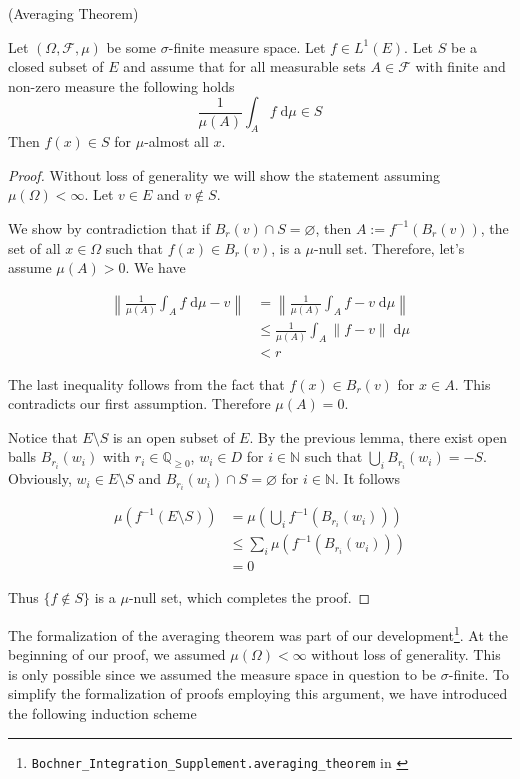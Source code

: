 \begin{theorem}\label{thm:averaging_theorem} (Averaging Theorem) \par
Let $(\Omega, \mathcal{F}, \mu)$ be some $\sigma$-finite measure space. Let $f \in L^1(E)$. Let $S$ be a closed subset of $E$ and assume that for all measurable sets $A \in \mathcal{F}$ with finite and non-zero measure the following holds
\[
	\frac{1}{\mu(A)}\int_A f \;\textrm{d}\mu \in S
\]
Then $f(x) \in S$ for $\mu$-almost all $x$.
\end{theorem}
\begin{proof}
Without loss of generality we will show the statement assuming $\mu(\Omega) < \infty$. Let $v \in E$ and $v \notin S$. 

We show by contradiction that if $B_r(v) \cap S = \varnothing$,  then $A := f^{-1}(B_r(v))$, the set of all $x \in \Omega$ such that $f(x) \in B_r(v)$, is a $\mu$-null set. Therefore, let's assume $\mu(A) > 0$. We have

\begin{align*}
	\left\lVert \frac{1}{\mu(A)}\int_A f \;\textrm{d}\mu  - v \right\rVert &= \left\lVert \frac{1}{\mu(A)}\int_A f - v \;\textrm{d}\mu \right\rVert \\
	&\le \frac{1}{\mu(A)}\int_A \lVert f - v \rVert \;\textrm{d}\mu \\
	&< r
\end{align*}

The last inequality follows from the fact that $f(x) \in B_r(v)$ for $x \in A$. This contradicts our first assumption. Therefore $\mu(A) = 0$.

Notice that $E \setminus S$ is an open subset of $E$. By the previous lemma, there exist open balls $B_{r_i}(w_i)$ with $r_i \in \mathbb{Q}_{\ge 0}$, $w_i \in D$ for $i \in \mathbb{N}$ such that $\bigcup_i B_{r_i}(w_i) = - S$. Obviously, $w_i \in E \setminus S$ and $B_{r_i}(w_i) \cap S = \varnothing$ for $i \in \mathbb{N}$. It follows

\begin{align*}
	\mu(f^{-1}(E \setminus S)) &= \mu\left(\bigcup_i f^{-1}(B_{r_i}(w_i))\right) \\
	&\le \sum_i \mu(f^{-1}(B_{r_i}(w_i))) \\
	&= 0
\end{align*}

Thus $\{f \notin S \}$ is a $\mu$-null set, which completes the proof.

\end{proof}

The formalization of the averaging theorem was part of our development\footnote{\texttt{Bochner\_Integration\_Supplement.averaging\_theorem} in \cite{Keskin_A_Formalization_of_2023}}. At the beginning of our proof, we assumed $\mu(\Omega) < \infty$ without loss of generality. This is only possible since we assumed the measure space in question to be $\sigma$-finite. To simplify the formalization of proofs employing this argument, we have introduced the following induction scheme

